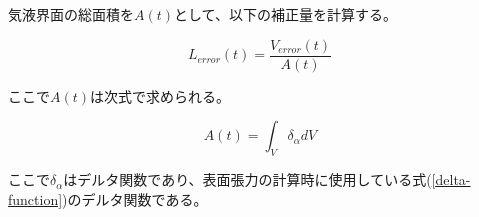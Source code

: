 気液界面の総面積を$A(t)$として、以下の補正量を計算する。

\begin{equation}
	L_{error} (t) = \frac{V_{error}(t)}{A(t)}
\end{equation}

ここで$A(t)$は次式で求められる。

\begin{equation}
	A(t) = \int_{V} \delta_{\alpha} dV
\end{equation}

ここで$\delta_{\alpha}$はデルタ関数であり、表面張力の計算時に使用している式(\ref{delta-function})のデルタ関数である。


\begin{comment}
\subsection{時間刻み幅}
時間刻み幅は移流項に関する制限$\Delta t_{c}$、表面張力項に関する制限$\Delta t_{s}$、粘性項に関する制限$\Delta t_{v}$を満足しなければならない。
時間制限は以下のように計算される\cite{Tsubogo2003},\cite{Sussman1994}。
ここで$Re$はレイノルズ数、$B$はボンド数（エトベス数$Eo$と同じ。$Bo=Eo=\Delta \rho g L^2/\sigma$）である。

\begin{equation}
	\Delta t_{c} = min( \frac{\Delta \bm{x}}{|\bm{u}|})
\end{equation}

\begin{equation}
	\Delta t_{v} = min( \frac{3}{14}(\rho(Re) \Delta \bm{x}^2 / \mu))
\end{equation}

\begin{equation}
	\Delta t_{s} = \sqrt{(\rho_{l} + \rho_{g}) \cdot \frac{B}{8 \pi}} \cdot \Delta \bm{x}^{\frac{3}{2}}
\end{equation}

\begin{equation}
	\Delta t^{n+1} \leq \frac{1}{2} min( \Delta t_{s}, \Delta t_{v}, \Delta t_{c})
\end{equation}
\end{comment}